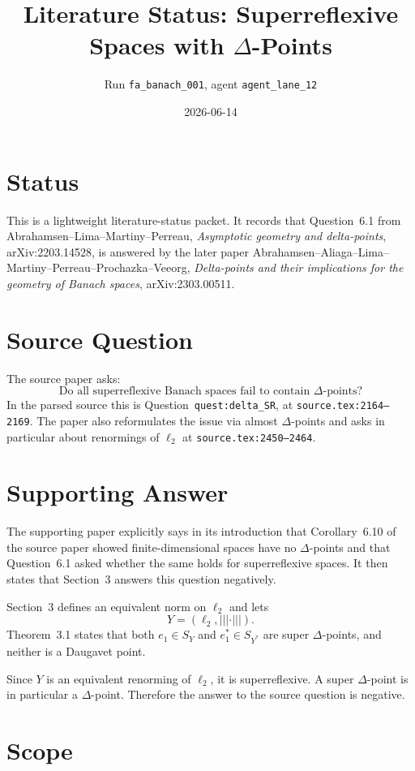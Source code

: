 \documentclass[11pt]{article}
\title{Literature Status: Superreflexive Spaces with \texorpdfstring{$\Delta$}{Delta}-Points}
\author{Run \texttt{fa\_banach\_001}, agent \texttt{agent\_lane\_12}}
\date{2026-06-14}
\newcommand{\ellTwo}{\ell_2}
\begin{document}
\maketitle

\section*{Status}

This is a lightweight literature-status packet.  It records that Question~6.1
from Abrahamsen--Lima--Martiny--Perreau, \emph{Asymptotic geometry and
delta-points}, arXiv:2203.14528, is answered by the later paper
Abrahamsen--Aliaga--Lima--Martiny--Perreau--Prochazka--Veeorg,
\emph{Delta-points and their implications for the geometry of Banach spaces},
arXiv:2303.00511.

\section*{Source Question}

The source paper asks:
\[
\text{Do all superreflexive Banach spaces fail to contain } \Delta
\text{-points?}
\]
In the parsed source this is Question~\texttt{quest:delta\_SR}, at
\texttt{source.tex:2164--2169}.  The paper also reformulates the issue via
almost $\Delta$-points and asks in particular about renormings of $\ellTwo$ at
\texttt{source.tex:2450--2464}.

\section*{Supporting Answer}

The supporting paper explicitly says in its introduction that Corollary~6.10
of the source paper showed finite-dimensional spaces have no $\Delta$-points
and that Question~6.1 asked whether the same holds for superreflexive spaces.
It then states that Section~3 answers this question negatively.

Section~3 defines an equivalent norm on $\ellTwo$ and lets
\[
Y=(\ellTwo,\vert\!\vert\!\vert\cdot\vert\!\vert\!\vert).
\]
Theorem~3.1 states that both $e_1\in S_Y$ and $e_1^*\in S_{Y^*}$ are super
$\Delta$-points, and neither is a Daugavet point.

Since $Y$ is an equivalent renorming of $\ellTwo$, it is superreflexive.  A
super $\Delta$-point is in particular a $\Delta$-point.  Therefore the answer
to the source question is negative.

\section*{Scope}
\end{document}
